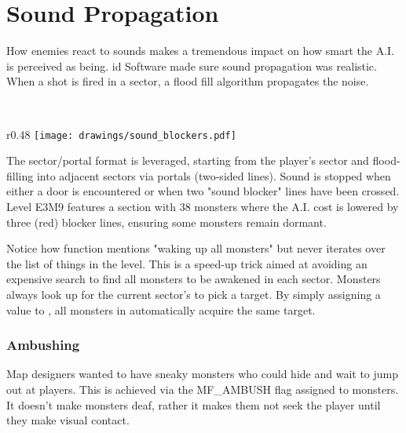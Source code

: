 \section{Sound Propagation}
How enemies react to sounds makes a tremendous impact on how smart the A.I. is perceived as being. id Software made sure sound propagation was realistic. When a shot is fired in a sector, a flood fill algorithm propagates the noise.\\
\par
{}\\

\begin{wrapfigure}[10]{r}{0.48\textwidth}
\centering
\texttt{[image: drawings/sound\_blockers.pdf]}
\end{wrapfigure}
  The sector/portal format is leveraged, starting from the player's sector and flood-filling into adjacent sectors via portals (two-sided lines). Sound is stopped when either a door is encountered or when two "sound blocker" lines have been crossed. Level E3M9 features a section with 38 monsters where the A.I. cost is lowered by three (red) blocker lines, ensuring some monsters remain dormant.\\
\par
Notice how function  mentions "waking up all monsters" but never iterates over the list of things in the level. This is a speed-up trick aimed at avoiding an expensive search to find all monsters to be awakened in each sector. Monsters always look up for the current sector's  to pick a target. By simply assigning a value to , all monsters in  automatically acquire the same target.\\
\par
{}
\par
\subsubsection{Ambushing}
Map designers wanted to have sneaky monsters who could hide and wait to jump out at players. This is achieved via the MF\_AMBUSH flag assigned to monsters. It doesn't make monsters deaf, rather it makes them not seek the player until they make visual contact.



